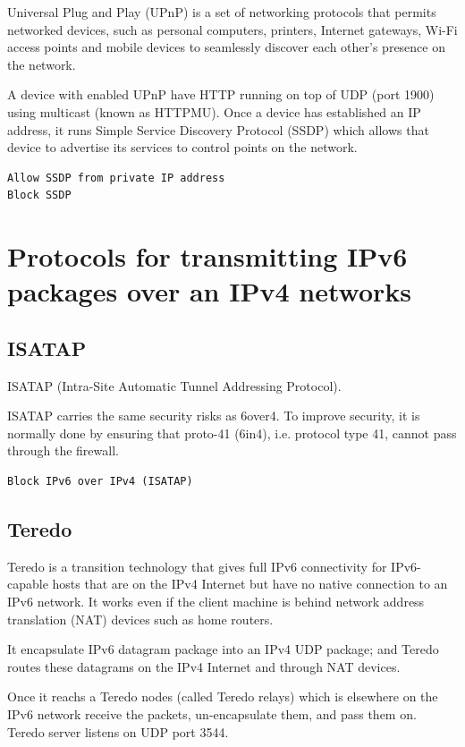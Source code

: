 Universal Plug and Play (UPnP) is a set of networking protocols that permits
networked devices, such as personal computers, printers, Internet gateways,
Wi-Fi access points and mobile devices to seamlessly discover each other's
presence on the network. 

A device with enabled UPnP have HTTP running on top of UDP (port 1900) using
multicast (known as HTTPMU). Once a device has established an IP address, it
runs Simple Service Discovery Protocol (SSDP) which allows that device to
advertise its services to control points on the network.

\begin{verbatim}
Allow SSDP from private IP address
Block SSDP 
\end{verbatim}

\section{Protocols for transmitting IPv6 packages over an IPv4 networks}

\subsection{ISATAP}
\label{sec:ISATAP}

ISATAP (Intra-Site Automatic Tunnel Addressing Protocol).

ISATAP carries the same security risks as 6over4. To improve security, it is
normally done by ensuring that proto-41 (6in4), i.e. protocol type 41,  cannot
pass through the firewall.
\begin{verbatim}
Block IPv6 over IPv4 (ISATAP)
\end{verbatim}


\subsection{Teredo}
\label{sec:Teredo}


Teredo is a transition technology that gives full IPv6 connectivity for
IPv6-capable hosts that are on the IPv4 Internet but have no native connection
to an IPv6 network.  It works even if the client machine is behind  network
address translation (NAT) devices such as home routers.

It encapsulate IPv6 datagram package into an IPv4
UDP package; and Teredo routes these datagrams on the IPv4 Internet and through
NAT devices. 

Once it reachs a Teredo nodes (called Teredo relays) which is elsewhere on the
IPv6 network receive the packets, un-encapsulate them, and pass them on. Teredo
server listens on UDP port 3544.

